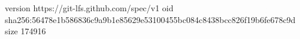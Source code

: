 version https://git-lfs.github.com/spec/v1
oid sha256:56478e1b586836c9a9b1e85629e53100455bc084c8438bcc826f19b6fe678c9d
size 174916
